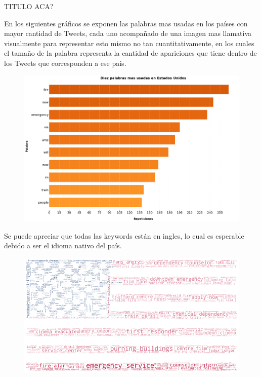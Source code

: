 \documentclass[titlepage,a4paper]{article}
\begin{document}
    TITULO ACA?
    
    En los siguientes gráficos se exponen las palabras mas usadas en los países con mayor cantidad de Tweets, cada uno acompañado de una imagen mas llamativa visualmente para representar esto mismo no tan cuantitativamente, en los cuales el tamaño de la palabra representa la cantidad de apariciones que tiene dentro de los Tweets que corresponden a ese país.
    
    \begin{figure}[H]
    \centering
    \includegraphics[width=1\textwidth]{graficos/Analisis de Locacion/10_palabras_mas_usadas_usa.png}
    \caption{}
    \end{figure}
    Se puede apreciar que todas las keywords están en ingles, lo cual es esperable debido a ser el idioma nativo del país.

    \begin{figure}[H]
    \centering
    \includegraphics[width=1\textwidth]{graficos/Analisis de Locacion/bandera_usa.png}
    \caption{}
    \end{figure}
    
\end{document}
